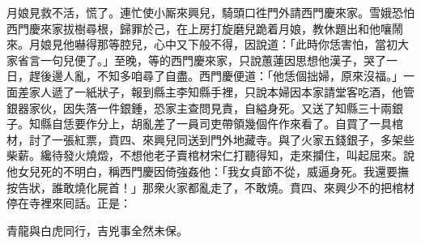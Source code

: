 月娘見救不活，慌了。連忙使小厮來興兒，騎頭口徃門外請西門慶來家。雪娥恐怕西門慶來家拔樹尋根，歸罪於己，在上房打旋磨兒跪着月娘，教休題出和他嚷鬧來。月娘見他嚇得那等腔兒，心中又下般不得，因說道：「此時你恁害怕，當初大家省言一句兒便了。」至晚，等的西門慶來家，只說蕙蓮因思想他漢子，哭了一日，趕後邊人亂，不知多咱尋了自盡。西門慶便道：「他恁個拙婦，原來沒福。」{}一面差家人遞了一紙狀子，報到縣主李知縣手裡，只說本婦因本家請堂客吃酒，他管銀器家伙，因失落一件銀鍾，恐家主查問見責，自縊身死。又送了知縣三十兩銀子。知縣自恁要作分上，胡亂差了一員司吏帶領幾個仵作來看了。自買了一具棺材，討了一張紅票，賁四、來興兒同送到門外地藏寺。與了火家五錢銀子，多架些柴薪。纔待發火燒燬，不想他老子賣棺材宋仁打聽得知，走來攔住，叫起屈來。說他女兒死的不明白，稱西門慶因倚強姦他：「我女貞節不從，威逼身死。我還要撫按告狀，誰敢燒化屍首！」那衆火家都亂走了，不敢燒。賁四、來興少不的把棺材停在寺裡來囘話。正是：

\begin{myquote}
青龍與白虎同行，吉兇事全然未保。
\end{myquote}

